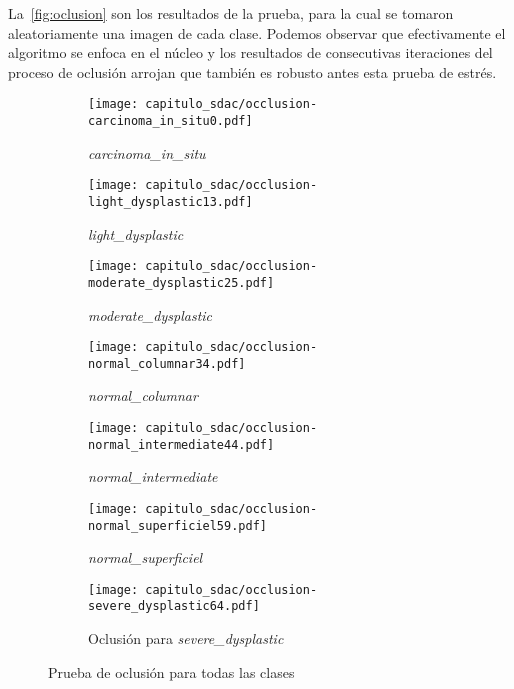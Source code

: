 La~\autoref{fig:oclusion} son los resultados de la prueba, para la cual se tomaron
aleatoriamente una imagen de cada clase. Podemos observar que efectivamente el 
algoritmo se enfoca en el núcleo y los resultados de consecutivas iteraciones del proceso
de oclusión arrojan que también es robusto antes esta prueba de estrés.
  \begin{figure}[H] %
    \begin{subfigure}{0.40\textwidth}
    \texttt{[image: capitulo\_sdac/occlusion-carcinoma\_in\_situ0.pdf]}
    \caption{\emph{carcinoma\_in\_situ}}\label{fig:a}
    \end{subfigure}\hspace*{\fill}
    \begin{subfigure}{0.40\textwidth}
    \texttt{[image: capitulo\_sdac/occlusion-light\_dysplastic13.pdf]}
    \caption{\emph{light\_dysplastic}}\label{fig:b}
    \end{subfigure}
    
    \medskip
    \begin{subfigure}{0.40\textwidth}
    \texttt{[image: capitulo\_sdac/occlusion-moderate\_dysplastic25.pdf]}
    \caption{\emph{moderate\_dysplastic}}\label{fig:cc}
    \end{subfigure}\hspace*{\fill}
    \begin{subfigure}{0.40\textwidth}
    \texttt{[image: capitulo\_sdac/occlusion-normal\_columnar34.pdf]}
    \caption{\emph{normal\_columnar}}\label{fig:dd}
    \end{subfigure}
    
    \medskip
    \begin{subfigure}{0.40\textwidth}
    \texttt{[image: capitulo\_sdac/occlusion-normal\_intermediate44.pdf]}
    \caption{\emph{normal\_intermediate}}\label{fig:c}
    \end{subfigure}\hspace*{\fill}
    \begin{subfigure}{0.40\textwidth}
    \texttt{[image: capitulo\_sdac/occlusion-normal\_superficiel59.pdf]}
    \caption{\emph{normal\_superficiel}}\label{fig:d}
    \end{subfigure}

    \centering
    \begin{subfigure}{0.40\textwidth}
      
    \texttt{[image: capitulo\_sdac/occlusion-severe\_dysplastic64.pdf]}
    \caption{Oclusión para \emph{severe\_dysplastic}}\label{fig:e}
    \end{subfigure}
    
    \caption{Prueba de oclusión para todas las clases}\label{fig:oclusion}
    \end{figure}
    

